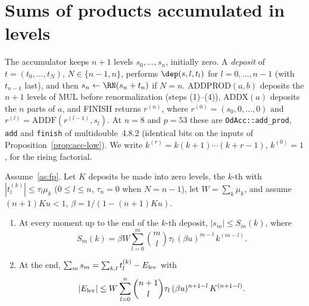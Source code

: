 
\section{Sums of products accumulated in levels}\label{sec:acc}

The accumulator keeps $n+1$ levels $s_0, \dots, s_n$, initially zero. A \emph{deposit} of $t = (t_0, \dots, t_N)$,
$N \in \{n-1, n\}$, performs $\dep(s, l, t_l)$ for $l = 0, \dots, n-1$ (with $t_{n-1}$ last), and then $s_n \gets
\RN(s_n + t_n)$ if $N = n$. ADDPROD$(a, b)$ deposits the $n+1$ levels of MUL before renormalization (steps (1)--(4)),
ADDX$(a)$ deposits the $n$ parts of $a$, and FINISH returns $r^{(n)}$, where $r^{(0)} = (s_0, 0, \dots, 0)$ and
$r^{(l)} = \mathrm{ADDF}(r^{(l-1)}, s_l)$. At $n = 8$ and $p = 53$ these are \texttt{OdAcc::add\_prod}, \texttt{add}
and \texttt{finish} of multidouble~4.8.2 (identical bits on the inputs of Proposition~\ref{prop:acc-low}). We write
$k^{(r)} = k(k+1)\cdots(k+r-1)$, $k^{(0)} = 1$, for the rising factorial.

\begin{lemma}\label{lem:acc}
Assume~\ref{as:fp}. Let $K$ deposits be made into zero levels, the $k$-th with $|t^{(k)}_l| \le \tau_l\mu_k$ ($0 \le l
\le n$, $\tau_n = 0$ when $N = n - 1$), let $W = \sum_k \mu_k$, and assume $(n+1)Ku < 1$, $\beta = 1/(1 - (n+1)Ku)$.
\begin{enumerate}
\item[(a)] At every moment up to the end of the $k$-th deposit, $|s_m| \le S_m(k)$, where
\[
S_m(k) = \beta W\sum_{l=0}^{m}\binom{m}{l}\tau_l\,(\beta u)^{m-l}\,k^{(m-l)}.
\]
\item[(b)] At the end, $\sum_m s_m = \sum_{k,l} t^{(k)}_l - E_{\rm lev}$ with
\[
|E_{\rm lev}| \le W\sum_{l=0}^{n}\binom{n+1}{l}\tau_l\,(\beta u)^{n+1-l}\,K^{(n+1-l)}.
\]
\end{enumerate}
\end{lemma}

